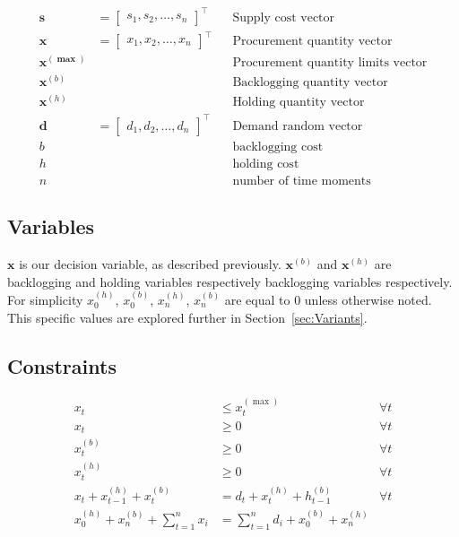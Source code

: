 \begin{align*}
    \mathbf{s} &= \begin{bmatrix}
        s_1, s_2, \dotsc, s_n
    \end{bmatrix}^\intercal && \text{Supply cost vector} \\
    \mathbf{x} &= \begin{bmatrix}
        x_1, x_2, \dotsc, x_n
    \end{bmatrix}^\intercal && \text{Procurement quantity vector} \\
    \mathbf{x^{(\max)}}  & && \text{Procurement quantity limits vector} \\
    \mathbf{x}^{(b)}  & && \text{Backlogging quantity vector} \\
    \mathbf{x}^{(h)}  & && \text{Holding quantity vector} \\
    \mathbf{d} &= \begin{bmatrix}
        d_1, d_2, \dotsc, d_n
    \end{bmatrix}^\intercal && \text{Demand random vector} \\
    b & && \text{backlogging cost} \\
    h & && \text{holding cost} \\
    n & && \text{number of time moments}
\end{align*}

\subsection{Variables}
\label{sub:Variables}
$\mathbf{x}$ is our decision variable, as described previously. $\mathbf{x}^{(b)}$ and $\mathbf{x}^{(h)}$ are backlogging and holding variables respectively backlogging variables respectively. For simplicity
$x^{(h)}_0$, $x^{(b)}_0$,  $x^{(h)}_n$, $x^{(b)}_n$ are equal to $0$ unless otherwise noted. This specific values are explored further in Section~\ref{sec:Variants}.

\subsection{Constraints}
\label{sub:Constraints}
\begin{align*}
    x_t &\le x^{(\max)}_t & \forall t\\
    x_t &\ge 0 & \forall t\\
    x^{(b)}_t &\ge 0 & \forall t\\
    x^{(h)}_t &\ge 0 & \forall t\\
    x_t + x^{(h)}_{t - 1} + x^{(b)}_{t} &= d_t + x^{(h)}_t + h^{(b)}_{t - 1} & \forall t \\
    x^{(h)}_0 + x^{(b)}_n + \sum_{t=1}^n{x_i} &= \sum_{t=1}^n{d_i} + x^{(b)}_0 + x^{(h)}_n &\\
\end{align*}

